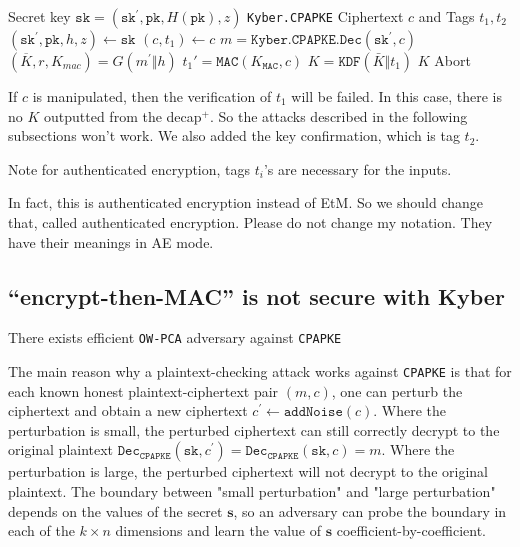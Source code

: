 \documentclass[floatrow,journal=tches,submission]{iacrtrans}
\newcommand{\decrypt}{\texttt{Dec}}
\newcommand{\mac}{\texttt{MAC}}
\newcommand{\pk}{\texttt{pk}}
\newcommand{\sk}{\texttt{sk}}
\begin{document}
\begin{algorithm}[H]
    \caption{$\texttt{Kyber.CCAKEM.Decap}^+ (\sk, c, t_1, t_2)$}
    \begin{algorithmic}[1]
        \Require Secret key $\sk = (\sk^\prime, \pk, H(\pk), z)$
        \Require \texttt{Kyber.CPAPKE} Ciphertext $c$ and Tags $t_1, t_2$
        \State $(\sk^\prime, \pk, h, z) \leftarrow \sk$
            \Comment{Unpack the secret key; $h$ is the hash of $\pk$}
        \State $(c, t_1) \leftarrow c$
        \State $ m = \texttt{Kyber.CPAPKE.Dec}(\sk^\prime, c)$ 
        \State $(\overline{K},   r, K_{mac}) =   G(m^\prime \Vert h)$
        \State $t_1'=\mac(K_\mac, c)$
            \State $K  = \texttt{KDF}(\bar{K} \Vert t_1)$ 
            \State \Return $K$
         \Else 
            \State Abort
        \EndIf
    \end{algorithmic}
\end{algorithm}

\begin{remark} If $c$ is manipulated, then the verification of  $t_1$  will be failed.  In this case, there is no $K$ outputted from the decap$^+$.  So the attacks described in the following subsections won't work.  We also added the key confirmation, which is tag $t_2$. 
\end{remark}


{\color{blue} Note for authenticated encryption, tags $t_i$'s are necessary for the inputs. 

In fact, this is authenticated encryption instead of EtM. So we should change that, called authenticated encryption. 
Please do not change my notation. They have their meanings in AE mode. }

\subsection{``encrypt-then-MAC'' is not secure with Kyber}
\begin{lemma}
    There exists efficient \texttt{OW-PCA} adversary against \texttt{CPAPKE}
\end{lemma}

The main reason why a plaintext-checking attack works against \texttt{CPAPKE} is that for each known honest plaintext-ciphertext pair $(m, c)$, one can perturb the ciphertext and obtain a new ciphertext $c^\prime \leftarrow \texttt{addNoise}(c)$. Where the perturbation is small, the perturbed ciphertext can still correctly decrypt to the original plaintext $\decrypt_\texttt{CPAPKE}(\sk, c^\prime) = \decrypt_\texttt{CPAPKE}(\sk, c) = m$. Where the perturbation is large, the perturbed ciphertext will not decrypt to the original plaintext. The boundary between "small perturbation" and "large perturbation" depends on the values of the secret $\mathbf{s}$, so an adversary can probe the boundary in each of the $k \times n$ dimensions and learn the value of $\mathbf{s}$ coefficient-by-coefficient.
\end{document}
